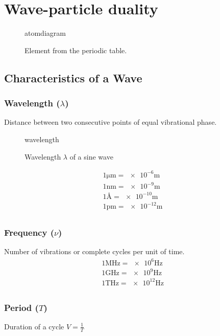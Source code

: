 \documentclass[10pt]{article}
\begin{document}
\section{Wave-particle duality}
\begin{figure}
	{atomdiagram}
	\caption{Element from the periodic table.}\label{fig:periodicelement}
\end{figure}

\subsection{Characteristics of a Wave}

\subsubsection*{Wavelength ($\lambda$)}
Distance between two consecutive points of equal vibrational phase.

\begin{figure}[H]
	\centering
	{wavelength}
	\caption{Wavelength $\lambda$ of a sine wave}\label{fig:wavelength}
\end{figure}
\begin{align*}
	1\si{\micro\metre} = \num{e-6}\si{\metre} \\[0.5em]
	1\si{\nano\metre} = \num{e-9}\si{\metre}  \\[0.5em]
	1\si{\angstrom} = \num{e-10}\si{\metre}   \\[0.5em]
	1\si{\pico\metre} = \num{e-12}\si{\metre} \\[0.5em]
\end{align*}

\subsubsection*{Frequency ($\nu$)}
Number of vibrations or complete cycles per unit of time.
\begin{align*}
	1\si{\mega\hertz} = \num{e6}\si{\hertz}  \\[0.5em]
	1\si{\giga\hertz} = \num{e9}\si{\hertz}  \\[0.5em]
	1\si{\tera\hertz} = \num{e12}\si{\hertz} \\[0.5em]
\end{align*}

\subsubsection*{Period ($T$)}
Duration of a cycle $V=\frac{1}{T}$
\end{document}
